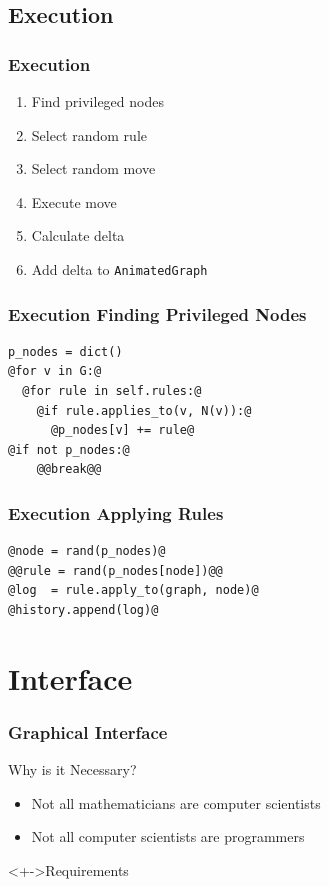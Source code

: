 \documentclass{beamer}
\begin{document}
\subsection{Execution}
\begin{frame}
  \frametitle{Execution}
  \begin{enumerate}[<+->]
  \item Find privileged nodes
  \item Select random rule
  \item Select random move
  \item Execute move
  \item Calculate delta
  \item Add delta to \texttt{AnimatedGraph}
  \end{enumerate}
\end{frame}
\begin{frame}[fragile]
  \frametitle{Execution \Dash Finding Privileged Nodes}
\begin{lstlisting}[style=pystep]
p_nodes = dict()
@for v in G:@
  @for rule in self.rules:@
    @if rule.applies_to(v, N(v)):@
      @p_nodes[v] += rule@
@if not p_nodes:@
    @@break@@
\end{lstlisting}
\end{frame}
\begin{frame}[fragile]
  \frametitle{Execution \Dash Applying Rules}
\begin{lstlisting}[style=pystep]
@node = rand(p_nodes)@
@@rule = rand(p_nodes[node])@@
@log  = rule.apply_to(graph, node)@
@history.append(log)@
\end{lstlisting}
\end{frame}

\section{Interface}
\ifTOC\frame{\tableofcontents[currentsection]}\fi
\begin{frame}
  \frametitle{Graphical Interface}
  \begin{block}{Why is it Necessary?}
    \begin{itemize}[<+->]
    \item Not all mathematicians are computer scientists
    \item Not all computer scientists are programmers
    \end{itemize}
  \end{block}
  \begin{block}<+->{Requirements}
  \end{block}
\end{frame}
\end{document}
